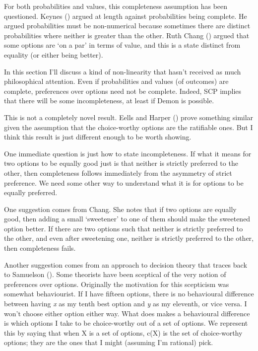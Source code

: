 \documentclass[
  10pt,
  letterpaper,
  DIV=11,
  numbers=noendperiod,
  twoside]{scrartcl}
\begin{document}
For both probabilities and values, this completeness assumption has been
questioned. Keynes () argued at length
against probabilities being complete. He argued probabilities must be
non-numerical because sometimes there are distinct probabilities where
neither is greater than the other. Ruth Chang
() argued that some options are `on a par'
in terms of value, and this is a state distinct from equality (or either
being better).

In this section I'll discuss a kind of non-linearity that hasn't
received as much philosophical attention. Even if probabilities and
values (of outcomes) are complete, preferences over options need not be
complete. Indeed, SCP implies that there will be some incompleteness, at
least if Demon is possible.

This is not a completely novel result. Eells and Harper
() prove something similar given the
assumption that the choice-worthy options are the ratifiable ones. But I
think this result is just different enough to be worth showing.

One immediate question is just how to state incompleteness. If what it
means for two options to be equally good just is that neither is
strictly preferred to the other, then completeness follows immediately
from the asymmetry of strict preference. We need some other way to
understand what it is for options to be equally preferred.

One suggestion comes from Chang. She notes that if two options are
equally good, then adding a small `sweetener' to one of them should make
the sweetened option better. If there are two options such that neither
is strictly preferred to the other, and even after sweetening one,
neither is strictly preferred to the other, then completeness fails.

Another suggestion comes from an approach to decision theory that traces
back to Samuelson (). Some theorists
have been sceptical of the very notion of preferences over options.
Originally the motivation for this scepticism was somewhat behaviourist.
If I have fifteen options, there is no behavioural difference between
having \emph{x} as my tenth best option and \emph{y} as my eleventh, or
vice versa. I won't choose either option either way. What does makes a
behavioural difference is which options I take to be choice-worthy out
of a set of options. We represent this by saying that when X is a set of
options, c(X) is the set of choice-worthy options; they are the ones
that I might (assuming I'm rational) pick.
\end{document}
